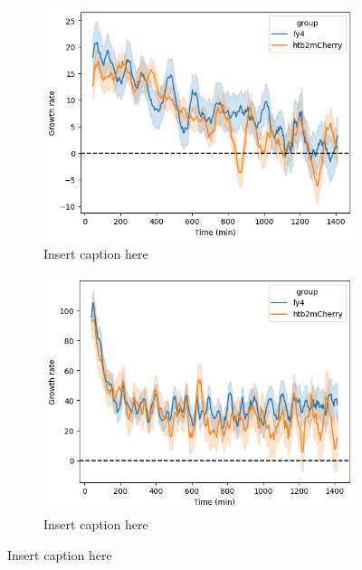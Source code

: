 \begin{figure}
  \centering
  \begin{subfigure}[htpb]{0.45\textwidth}
   \centering
   \includegraphics[width=\textwidth]{allstrains_31492_gr}
   \caption{
     Insert caption here
   }
   \label{fig:biology-lowglc-gr}
  \end{subfigure}%
  \begin{subfigure}[htpb]{0.45\textwidth}
   \centering
   \includegraphics[width=\textwidth]{allstrains_26643_gr}
   \caption{
     Insert caption here
   }
   \label{fig:biology-highglc-gr}
  \end{subfigure}


\end{figure}
